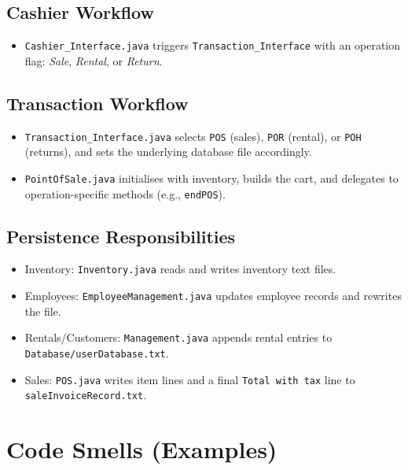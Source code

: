 \subsection*{Cashier Workflow}

\begin{itemize}[leftmargin=1.2cm]
  \item \texttt{Cashier\_Interface.java} triggers
        \texttt{Transaction\_Interface} with an operation flag:
        \emph{Sale}, \emph{Rental}, or \emph{Return}.
\end{itemize}

\subsection*{Transaction Workflow}

\begin{itemize}[leftmargin=1.2cm]
  \item \texttt{Transaction\_Interface.java} selects
        \texttt{POS} (sales), \texttt{POR} (rental), or
        \texttt{POH} (returns), and sets the underlying database file
        accordingly.
  \item \texttt{PointOfSale.java} initialises with inventory, builds the
        cart, and delegates to operation-specific methods (e.g.,
        \texttt{endPOS}).
\end{itemize}

\subsection*{Persistence Responsibilities}

\begin{itemize}[leftmargin=1.2cm]
  \item Inventory: \texttt{Inventory.java} reads and writes inventory
        text files.
  \item Employees: \texttt{EmployeeManagement.java} updates employee
        records and rewrites the file.
  \item Rentals/Customers: \texttt{Management.java} appends rental
        entries to \texttt{Database/userDatabase.txt}.
  \item Sales: \texttt{POS.java} writes item lines and a final
        \texttt{Total with tax} line to \texttt{saleInvoiceRecord.txt}.
\end{itemize}

\section{Code Smells (Examples)}


